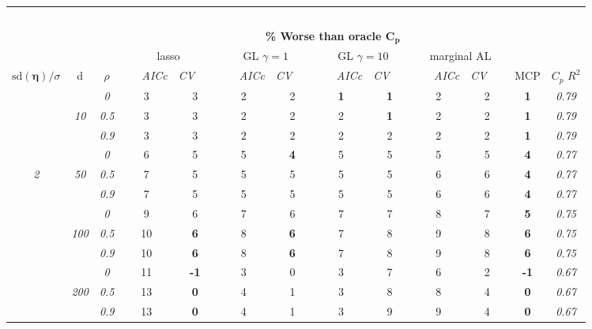\documentclass[12pt]{article}
\newcommand{\bs}[1]{\boldsymbol{#1}}
\newcommand{\mr}[1]{\mathrm{#1}}
\begin{document}
\begin{table}
\vspace{-.2cm}
\footnotesize
\begin{center}
\begin{tabular}{ccc|cc|cc|cc|cc|c|c}
\hline &&&\multicolumn{9}{|c|}{~}\\[-2ex]
\multicolumn{3}{c}{~}&\multicolumn{9}{|c|}{\bf \% Worse than oracle $\boldsymbol{C_p}$  } &   \\[.5ex]
& &
& \multicolumn{2}{c}{lasso} 
& \multicolumn{2}{c}{GL $\gamma=1$} 
& \multicolumn{2}{c}{GL $\gamma=10$} 
& \multicolumn{2}{c}{marginal AL} 
& \multicolumn{1}{c|}{~} & \\[-0.5ex]
$\mr{sd}(\bs{\eta})/\sigma$ & {\sf d} & $\rho$ 
& ~~~\scriptsize\it AICc & \multicolumn{1}{c}{\scriptsize\it CV~~~}
& ~~~\scriptsize\it AICc & \multicolumn{1}{c}{\scriptsize\it CV~~~}
& ~~~\scriptsize\it AICc & \multicolumn{1}{c}{\scriptsize\it CV~~~}
& ~~~\scriptsize\it AICc & \multicolumn{1}{c}{\scriptsize\it CV~~~} 
& \multicolumn{1}{c|}{ MCP} & $C_p$ $R^2$ \\[.5ex]
\hline\rule{0pt}{3ex}
& & \it  0  & 3 & 3 & 2 & 2 & {\bf 1} & {\bf 1} & 2 & 2 & {\bf 1} & \it  0.79 \\
 & \it  10  & \it  0.5  & 3 & 3 & 2 & 2 & 2 & {\bf 1} & 2 & 2 & {\bf 1} & \it  0.79 \\
& & \it  0.9  & 3 & 3 & 2 & 2 & 2 & 2 & 2 & 2 & {\bf 1} & \it  0.79 \\[1ex]
\cline{2-3}\rule{0pt}{3ex}
& & \it  0  & 6 & 5 & 5 & {\bf 4} & 5 & 5 & 5 & 5 & {\bf 4} & \it  0.77 \\
\it  2  & \it  50  & \it  0.5  & 7 & 5 & 5 & 5 & 5 & 5 & 6 & 6 & {\bf 4} & \it  0.77 \\
& & \it  0.9  & 7 & 5 & 5 & 5 & 5 & 5 & 6 & 6 & {\bf 4} & \it  0.77 \\[1ex]
\cline{2-3}\rule{0pt}{3ex}
& & \it  0  & 9 & 6 & 7 & 6 & 7 & 7 & 8 & 7 & {\bf 5} & \it  0.75 \\
 & \it  100  & \it  0.5  & 10 & {\bf 6} & 8 & {\bf 6} & 7 & 8 & 9 & 8 & {\bf 6} & \it  0.75 \\
& & \it  0.9  & 10 & {\bf 6} & 8 & {\bf 6} & 7 & 8 & 9 & 8 & {\bf 6} & \it  0.75 \\[1ex]
\cline{2-3}\rule{0pt}{3ex}
& & \it  0  & 11 & {\bf -1} & 3 & 0 & 3 & 7 & 6 & 2 & {\bf -1} & \it  0.67 \\
 & \it  200  & \it  0.5  & 13 & {\bf 0} & 4 & 1 & 3 & 8 & 8 & 4 & {\bf 0} & \it  0.67 \\
& & \it  0.9  & 13 & {\bf 0} & 4 & 1 & 3 & 9 & 9 & 4 & {\bf 0} & \it  0.67 \\[1ex]

\end{tabular}
\end{center}
\end{table}
\end{document}
